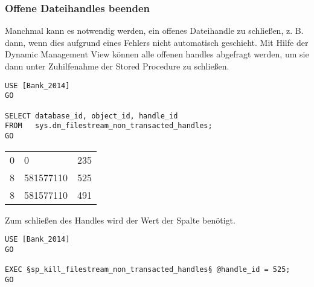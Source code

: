         \subsubsection{Offene Dateihandles beenden}
          Manchmal kann es notwendig werden, ein offenes Dateihandle zu
          schließen, z. B. dann, wenn dies aufgrund eines Fehlers nicht
          automatisch geschieht. Mit Hilfe der Dynamic Management View
           können alle
          offenen handles abgefragt werden, um sie dann unter Zuhilfenahme der
          Stored Procedure  zu
          schließen.
          \begin{lstlisting}[language=ms_sql, caption={Abfragen der offenen
          Filestream-Dateihandles}, label=admin04_07]
USE [Bank_2014]
GO

SELECT database_id, object_id, handle_id
FROM   sys.dm_filestream_non_transacted_handles;
GO 
          \end{lstlisting}
          \begin{center}
            \begin{small}
              \tablehead{}
              \begin{msoraclesql}
                \begin{supertabular}{lll}
                  0 & 0         & 235 \\
                  8 & 581577110 & 525 \\
                  8 & 581577110 & 491 \\
                \end{supertabular}
              \end{msoraclesql}
            \end{small}
          \end{center}
          Zum schließen des Handles wird der Wert der Spalte
           benötigt.
          \begin{lstlisting}[language=ms_sql, caption={Schließen eines offenen
          Filestream-Dateihandles}, label=admin04_08]
USE [Bank_2014]
GO

EXEC §sp_kill_filestream_non_transacted_handles§ @handle_id = 525;
GO
          \end{lstlisting}
          \begin{literaturinternet}
            \item \cite{ff929106}
            \item \cite{ff929168}
          \end{literaturinternet}